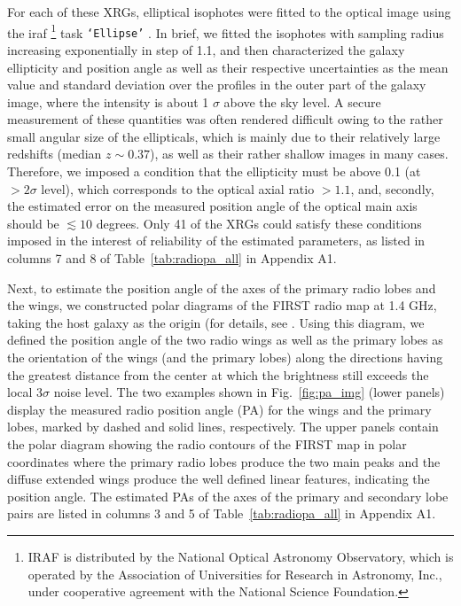 \documentclass[twocolumn]{aastex62}
\begin{document}
For each of these XRGs, elliptical 
isophotes were fitted to the optical image using the {\sc iraf}
\footnote{IRAF is distributed by the National Optical Astronomy
  Observatory, which is operated by the Association of Universities
  for Research in Astronomy, Inc., under cooperative agreement with
  the National Science Foundation.} task {\tt`Ellipse'}
\citep{Jedrzejewski1987MNRAS.226..747J}. In brief, we fitted the
isophotes with sampling radius increasing exponentially in step of
1.1, and then characterized the galaxy ellipticity and position angle
as well as their respective uncertainties as the mean value and
standard deviation over the profiles in the outer part of the galaxy
image, where the intensity is about 1 $\sigma$ above the sky level. A
secure measurement of these quantities was often rendered difficult
owing to the rather small angular size of the ellipticals, which is
mainly due to their relatively large redshifts (median $z \sim 0.37$),
as  well as their rather shallow images in many cases. Therefore, we
imposed a condition that the ellipticity must be above 0.1 (at $> 2
\sigma$ level), which corresponds to the optical axial ratio $> 1.1$,
and, secondly, the estimated error on the measured position angle of
the optical main axis should be $\lesssim 10 $ degrees. Only 41 of the
XRGs could satisfy these conditions imposed in the interest of
reliability of the estimated parameters, as listed in columns 7 and 8
of Table~\ref{tab:radiopa_all} in Appendix A1. \par


Next, to estimate the position angle of the axes of the primary radio
lobes and the wings, we constructed polar diagrams of the FIRST radio
map at 1.4 GHz, taking the host galaxy as the origin (for details, see
\citet{Gillone2016A&A...587A..25G}. Using this diagram, we defined the
position angle of the two radio wings as well as the primary lobes as
the orientation of the wings (and the primary lobes) along the
directions having the greatest distance from the center at which the
brightness still exceeds the local 3$\sigma$ noise level. The two
examples shown in Fig.~\ref{fig:pa_img} (lower panels) display the
measured radio position angle (PA) for the wings and the primary
lobes, marked by dashed and solid lines, respectively. The upper
panels contain the polar diagram showing the radio contours of the
FIRST map in polar coordinates where the primary radio lobes produce
the two main peaks and the diffuse extended wings produce the well
defined linear features, indicating the position angle. The estimated
PAs of the axes of the primary and secondary lobe pairs are listed in
columns 3 and 5 of Table~\ref{tab:radiopa_all} in Appendix A1.
\end{document}
